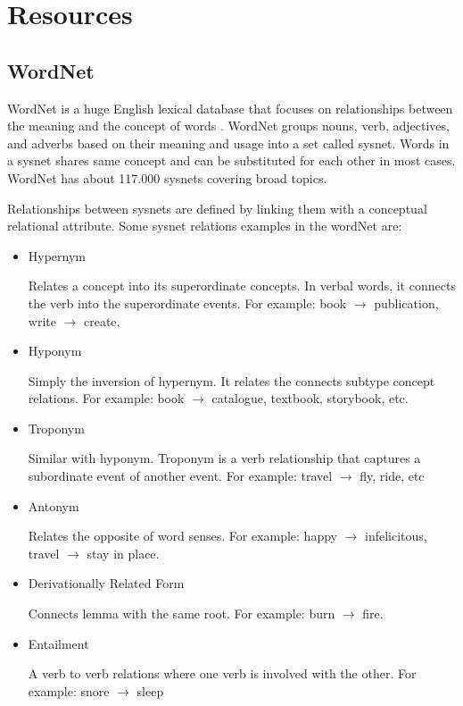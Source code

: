 \section{Resources}


\subsection{WordNet}


WordNet is a huge English lexical database that focuses on relationships between the meaning and the concept of words \cite{wordnet1}\cite{wordnet2}. WordNet groups nouns, verb, adjectives, and adverbs based on their meaning and usage into a set called sysnet. Words in a sysnet shares same concept and can be substituted for each other in most cases. WordNet has about 117.000 sysnets covering broad topics\cite{wordnet3}.


Relationships between sysnets are defined by linking them with a conceptual relational attribute. Some sysnet relations examples in the wordNet are:

\begin{itemize}

\item Hypernym


Relates a concept into its superordinate concepts. In verbal words, it connects the verb into the superordinate events. For example: book $\rightarrow$ publication, write $\rightarrow$ create.

\item Hyponym


Simply the inversion of hypernym. It relates the connects subtype concept relations. For example: book $\rightarrow$ catalogue, textbook, storybook, etc. 


\item Troponym


Similar with hyponym. Troponym is a verb relationship that captures a subordinate event of another event. For example: travel $\rightarrow$ fly, ride, etc


\item Antonym


Relates the opposite of word senses. For example: happy $\rightarrow$ infelicitous, travel $\rightarrow$ stay in place.


\item Derivationally Related Form


Connects lemma with the same root. For example: burn $\rightarrow$ fire.


\item Entailment 


A verb to verb relations where one verb is involved with the other. For example: snore $\rightarrow$ sleep


\end{itemize}


